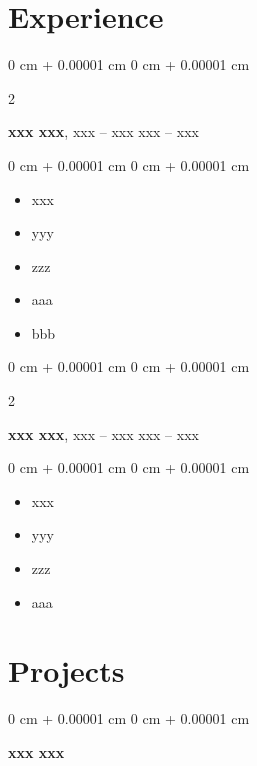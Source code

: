 \documentclass[10pt, letterpaper]{article}
\newenvironment{highlights}{
    \begin{itemize}[
        topsep=0.10 cm,
        parsep=0.10 cm,
        partopsep=0pt,
        itemsep=0pt,
        leftmargin=0 cm + 10pt
    ]
}{
    \end{itemize}
} %
\newenvironment{onecolentry}{
    \begin{adjustwidth}{
        0 cm + 0.00001 cm
    }{
        0 cm + 0.00001 cm
    }
}{
    \end{adjustwidth}
} %
\newenvironment{twocolentry}[2][]{
    \onecolentry
    \def\secondColumn{#2}
    \setcolumnwidth{\fill, 4.5 cm}
    \begin{paracol}{2}
}{
    \switchcolumn \raggedleft \secondColumn
    \end{paracol}
    \endonecolentry
} %
\begin{document}
    \section{Experience}

        \begin{twocolentry}{
            xxx – xxx
        }
            \textbf{xxx xxx}, xxx -- xxx\end{twocolentry}

        \vspace{0.10 cm}
        \begin{onecolentry}
            \begin{highlights}
                \item xxx
                \item yyy
                \item zzz
                \item aaa
                \item bbb
            \end{highlights}
        \end{onecolentry}

        \vspace{0.2 cm}

        \begin{twocolentry}{
            xxx – xxx
        }
            \textbf{xxx xxx}, xxx -- xxx\end{twocolentry}

        \vspace{0.10 cm}
        \begin{onecolentry}
            \begin{highlights}
                \item xxx
                \item yyy
                \item zzz
                \item aaa
                
            \end{highlights}
        \end{onecolentry}

    \section{Projects}

        \begin{onecolentry}{
            
        }
            \textbf{xxx xxx}\end{onecolentry}
\end{document}
